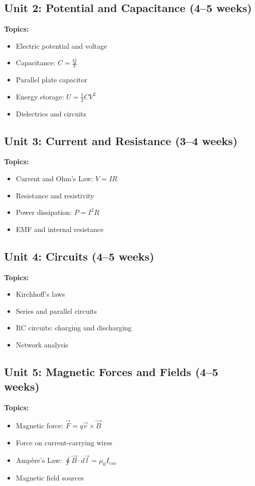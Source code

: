 \documentclass[12pt,oneside]{book}
\begin{document}
\subsection{Unit 2: Potential and Capacitance (4--5 weeks)}

\textbf{Topics:}
\begin{itemize}
    \item Electric potential and voltage
    \item Capacitance: $C = \frac{Q}{V}$
    \item Parallel plate capacitor
    \item Energy storage: $U = \frac{1}{2}CV^2$
    \item Dielectrics and circuits
\end{itemize}

\subsection{Unit 3: Current and Resistance (3--4 weeks)}

\textbf{Topics:}
\begin{itemize}
    \item Current and Ohm's Law: $V = IR$
    \item Resistance and resistivity
    \item Power dissipation: $P = I^2R$
    \item EMF and internal resistance
\end{itemize}

\subsection{Unit 4: Circuits (4--5 weeks)}

\textbf{Topics:}
\begin{itemize}
    \item Kirchhoff's laws
    \item Series and parallel circuits
    \item RC circuits: charging and discharging
    \item Network analysis
\end{itemize}

\subsection{Unit 5: Magnetic Forces and Fields (4--5 weeks)}

\textbf{Topics:}
\begin{itemize}
    \item Magnetic force: $\vec{F} = q\vec{v} \times \vec{B}$
    \item Force on current-carrying wires
    \item Ampère's Law: $\oint \vec{B} \cdot d\vec{l} = \mu_0 I_{enc}$
    \item Magnetic field sources
\end{itemize}
\end{document}
